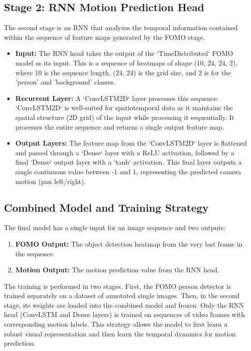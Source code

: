 \documentclass{article}
\begin{document}
\subsection{Stage 2: RNN Motion Prediction Head}
The second stage is an RNN that analyzes the temporal information contained within the sequence of feature maps generated by the FOMO stage.
\begin{itemize}
    \item \textbf{Input:} The RNN head takes the output of the `TimeDistributed` FOMO model as its input. This is a sequence of heatmaps of shape (10, 24, 24, 2), where 10 is the sequence length, (24, 24) is the grid size, and 2 is for the 'person' and 'background' classes.
    \item \textbf{Recurrent Layer:} A `ConvLSTM2D` layer processes this sequence. `ConvLSTM2D` is well-suited for spatiotemporal data as it maintains the spatial structure (2D grid) of the input while processing it sequentially. It processes the entire sequence and returns a single output feature map.
    \item \textbf{Output Layers:} The feature map from the `ConvLSTM2D` layer is flattened and passed through a `Dense` layer with a ReLU activation, followed by a final `Dense` output layer with a `tanh` activation. This final layer outputs a single continuous value between -1 and 1, representing the predicted camera motion (pan left/right).
\end{itemize}

\subsection{Combined Model and Training Strategy}
The final model has a single input for an image sequence and two outputs:
\begin{enumerate}
    \item \textbf{FOMO Output:} The object detection heatmap from the very last frame in the sequence.
    \item \textbf{Motion Output:} The motion prediction value from the RNN head.
\end{enumerate}
The training is performed in two stages. First, the FOMO person detector is trained separately on a dataset of annotated single images. Then, in the second stage, its weights are loaded into the combined model and frozen. Only the RNN head (ConvLSTM and Dense layers) is trained on sequences of video frames with corresponding motion labels. This strategy allows the model to first learn a robust visual representation and then learn the temporal dynamics for motion prediction.
\end{document}
